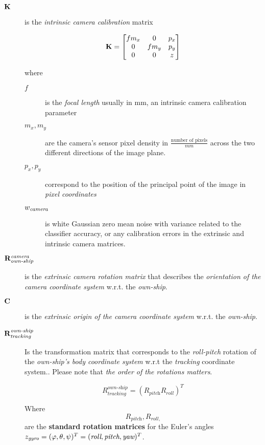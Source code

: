 \begin{description}
\item[$\mathbf{K}$]
is the \emph{intrinsic camera calibration} matrix

$$\mathbf{K} = \begin{bmatrix}f m_x &0 &p_x \\
0 &f m_y &p_y \\
0 &0 &z
\end{bmatrix} $$

where

\begin{description}
	\item[$f$] is the \emph{focal length} usually in mm, an intrinsic camera calibration parameter
	\item[$m_x, m_y$] are the camera's sensor pixel density in $\frac{\text{number of pixels}}{mm}$ across the two different directions of the image plane.
	\item[$p_x,p_y$] correspond to the position of the principal point of the image in \emph{pixel coordinates}
	\item[${w}_{\textit{camera}}$] is white Gaussian zero mean noise with variance related to the classifier accuracy, or any calibration errors in the extrinsic and intrinsic camera matrices.
	
\end{description}

\item[$\mathbf{R}_{\textit{own-ship}}^{\textit{camera}}$]
is the \emph{extrinsic camera rotation matrix }that describes the \emph{orientation of the camera coordinate system} w.r.t. the \emph{own-ship}.

\item[$\mathbf{C}$]
is the  \emph{extrinsic origin of the camera coordinate system} w.r.t. the \emph{own-ship}.


\item[$\mathbf{R}_{\textit{tracking}}^{\textit{own-ship}}$]
Is the transformation matrix that corresponds to the \emph{roll-pitch} rotation of the \emph{own-ship's body coordinate system} w.r.t the \emph{tracking} coordinate system.. Please note that \emph{the order of the rotations matters}.

\begin{equation}
R_{\textit{tracking}}^{\textit{own-ship}}=\left( R_{\textit{pitch}} R_{\textit{roll}}\right)^T
\end{equation}

Where $$R_{\textit{pitch}},R_{\textit{roll},}$$ are the \textbf{standard rotation matrices} \cite{LaVallea}for the Euler's angles $z_{\textit{gyro}}=({\varphi},{\theta},{\psi})^T = (\textit{roll},\textit{pitch},\textit{yaw})^T$.



\end{description}
